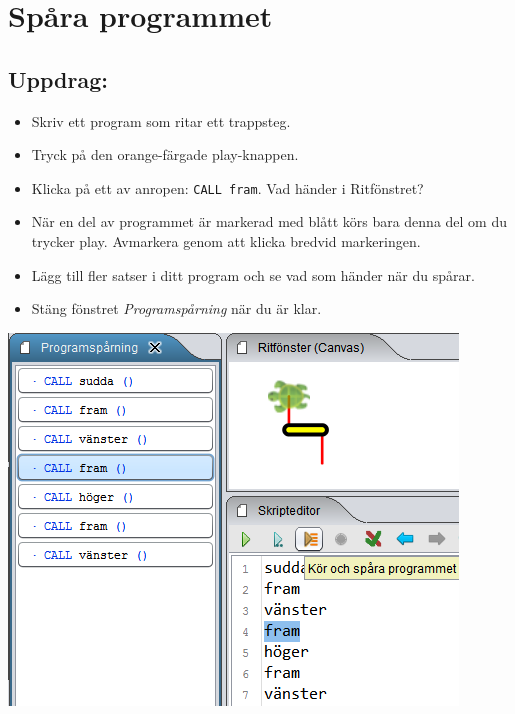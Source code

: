 \chapter{Spåra programmet}
\begin{multicols}{2}
\section*{\color{BrickRed}Uppdrag:}


\begin{itemize}

\item {Skriv ett program som ritar ett trappsteg.}
\item {Tryck på den orange-färgade play-knappen.}
\item {Klicka på ett av anropen: \lstinline{CALL fram}. Vad händer i Ritfönstret?}
\item {När en del av programmet är markerad med blått körs bara denna del om du trycker play. Avmarkera genom att klicka bredvid markeringen. }
\item {Lägg till fler satser i ditt program och se vad som händer när du spårar.}
\item {Stäng fönstret {\it Programspårning} när du är klar.}

\end{itemize}



\columnbreak

\begin{center}
\includegraphics{../img/trace.png}
\end{center}

\end{multicols}

